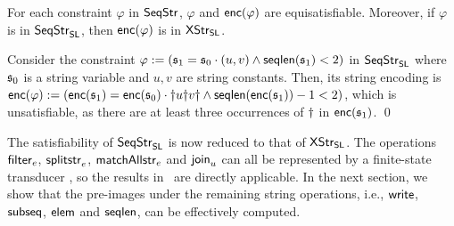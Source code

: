 \begin{proposition} %
For each  constraint $\varphi$ in ${\sf SeqStr}$, 
	$\varphi$ and ${\sf enc}(\varphi)$ are equisatisfiable.
	Moreover, if $\varphi$ is in ${\sf SeqStr}_{\sf SL}$, then ${\sf enc}(\varphi)$ is in ${\sf XStr}_{\sf SL}$.
\end{proposition}
\begin{example}
Consider the constraint $\varphi:= (\mathfrak{s}_1 = \mathfrak{s}_0\cdot(u,v)\wedge\mathsf{seqlen}(\mathfrak{s}_1) < 2)$ in  ${\sf SeqStr}_{\sf SL}$ where $\mathfrak{s}_0$ is a string variable and $u,v$ are string constants. 
Then, its string encoding is ${\sf enc}(\varphi):= ({\sf enc}(\mathfrak{s}_1) = {\sf enc}(\mathfrak{s}_0)\cdot \dag u \dag v \dag \wedge \mathsf{seqlen}({\sf enc}(\mathfrak{s}_1)) - 1  < 2)$, which is unsatisfiable, as there are at least three occurrences of $\dag$ in ${\sf enc}(\mathfrak{s}_1)$. \qed
\end{example}

The satisfiability of ${\sf SeqStr}_{\sf SL}$ is now reduced to that of ${\sf XStr}_{\sf SL}$. %
The operations ${\sf filter}_e$, $\mathsf{splitstr}_e$, $\mathsf{matchAllstr}_e$ and $\mathsf{join}_u$ can all be represented by a finite-state transducer , %
so the results in~\cite{atva2020} are directly applicable. 
In the next section, we show that the pre-images under the remaining string operations, i.e., %
$\mathsf{write}$, ${\sf subseq}$, ${\sf elem}$ and $\mathsf{seqlen}$,  can be effectively computed. 


